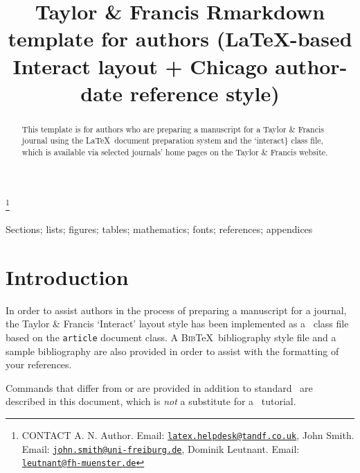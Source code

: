 \documentclass[]{interact}
\theoremstyle{plain}%
\theoremstyle{definition}
\theoremstyle{remark}
\begin{document}

\title{Taylor \& Francis Rmarkdown template for authors (\LaTeX-based
\textsf{Interact} layout + Chicago author-date reference style)}


\author{
}

\thanks{CONTACT A. N. Author. Email: \href{mailto:latex.helpdesk@tandf.co.uk}{\nolinkurl{latex.helpdesk@tandf.co.uk}}, John Smith. Email: \href{mailto:john.smith@uni-freiburg.de}{\nolinkurl{john.smith@uni-freiburg.de}}, Dominik Leutnant. Email: \href{mailto:leutnant@fh-muenster.de}{\nolinkurl{leutnant@fh-muenster.de}}}

\maketitle

\begin{abstract}
This template is for authors who are preparing a manuscript for a Taylor
\& Francis journal using the \LaTeX~document preparation system and the
`interact\} class file, which is available via selected journals' home
pages on the Taylor \& Francis website.
\end{abstract}

\begin{keywords}
Sections; lists; figures; tables; mathematics; fonts; references;
appendices
\end{keywords}

\hypertarget{introduction}{%
\section{Introduction}\label{introduction}}

In order to assist authors in the process of preparing a manuscript for
a journal, the Taylor \& Francis `\textsf{Interact}' layout style has
been implemented as a \LaTeXe~class file based on the \texttt{article}
document class. A \textsc{Bib}\TeX~bibliography style file and a sample
bibliography are also provided in order to assist with the formatting of
your references.

Commands that differ from or are provided in addition to standard
\LaTeXe~are described in this document, which is \emph{not} a substitute
for a \LaTeXe~tutorial.
\end{document}

